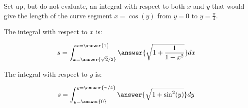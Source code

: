 \documentclass{ximera}
\author{Jim Talamo}
\begin{document}
\begin{exercise}

Set up, but do not evaluate, an integral with respect to both $x$ and $y$ that would give the length of the curve segment $x=\cos(y)$ from $y=0$ to $y=\frac{\pi}{4}$.

The integral with respect to $x$ is:

\[
s= \int_{
  x=\answer{\sqrt{2}/2}}
  ^{x=\answer{1}}
  \answer{\sqrt{1+\frac{1}{1-x^2}}} dx
\]

The integral with respect to $y$ is:

\[
s= \int_{y=\answer{0}}^{y=\answer{\pi/4}} \answer{\sqrt{1+\sin^2(y)}} dy
\]

\end{exercise}
\end{document}
